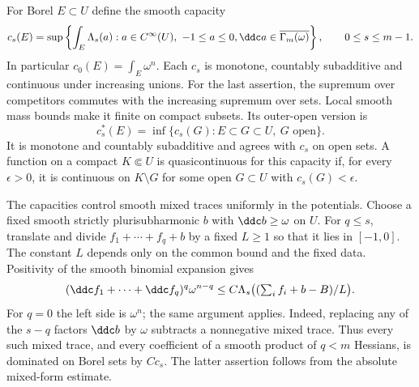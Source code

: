 For Borel $E\subset U$ define the smooth capacity
\[
 c_s(E)=\sup\left\{\int_E \Lambda_s(a):
        a\in C^\infty(U),\ -1\leq a\leq0,
        \ddc a\in\overline{\Gamma_m(\omega)}\right\},
       \qquad 0\leq s\leq m-1.
\]
In particular $c_0(E)=\int_E\omega^n$. Each $c_s$ is monotone,
countably subadditive and continuous under increasing unions.
For the last assertion, the supremum over competitors commutes with
the increasing supremum over sets. Local smooth mass bounds make it
finite on compact subsets. Its outer-open version is
\[
 c_s^*(E)=\inf\{c_s(G):E\subset G\subset U,\ G\text{ open}\}.
\]
It is monotone and countably subadditive and agrees with $c_s$ on
open sets. A function on a compact $K\Subset U$ is quasicontinuous
for this capacity if, for every $\epsilon>0$, it is continuous on
$K\setminus G$ for some open $G\subset U$ with $c_s(G)<\epsilon$.

The capacities control smooth mixed traces uniformly in the
potentials. Choose a fixed smooth strictly plurisubharmonic $b$ with
$\ddc b\geq\omega$ on $U$. For $q\leq s$, translate and divide
$f_1+\cdots+f_q+b$ by a fixed $L\geq1$ so that it lies in $[-1,0]$.
The constant $L$ depends only on the common bound and the fixed data.
Positivity of the smooth binomial expansion gives
\begin{equation}\label{eq:draft621:smooth-capacity-bound}
 (\ddc f_1+\cdots+\ddc f_q)^q\omega^{n-q}
       \leq C \Lambda_s\bigl((\textstyle\sum_i f_i+b-B)/L\bigr).
\end{equation}
For $q=0$ the left side is $\omega^n$; the same argument applies.
Indeed, replacing any of the $s-q$ factors $\ddc b$ by $\omega$
subtracts a nonnegative mixed trace. Thus every such mixed trace,
and every coefficient of a smooth product of $q<m$ Hessians, is
dominated on Borel sets by $C c_s$. The latter assertion follows
from the absolute mixed-form estimate.

